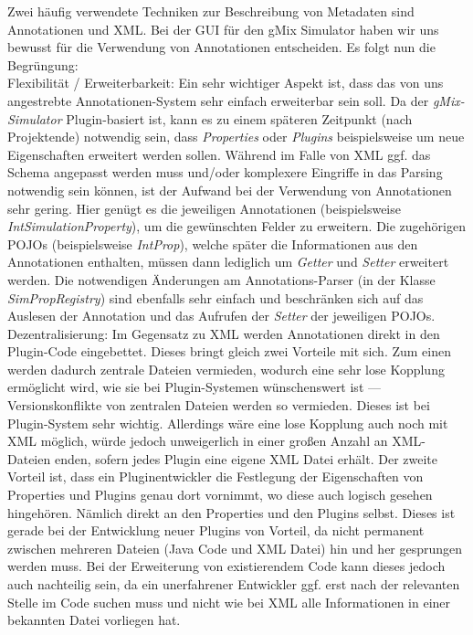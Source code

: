 \documentclass[a4paper, 11pt]{article} %
\begin{document}
Zwei häufig verwendete Techniken zur Beschreibung von Metadaten sind Annotationen und XML. Bei der GUI für den gMix Simulator haben wir uns bewusst für die Verwendung von Annotationen entscheiden. Es folgt nun die Begrüngung:\\

Flexibilität / Erweiterbarkeit: Ein sehr wichtiger Aspekt ist, dass das von uns angestrebte Annotationen-System sehr einfach erweiterbar sein soll. Da der \emph{gMix-Simulator} Plugin-basiert ist, kann es zu einem späteren Zeitpunkt (nach Projektende) notwendig sein, dass \emph{Properties} oder \emph{Plugins} beispielsweise um neue Eigenschaften erweitert werden sollen. Während im Falle von XML ggf. das Schema angepasst werden muss und/oder komplexere Eingriffe in das Parsing notwendig sein können, ist der Aufwand bei der Verwendung von Annotationen sehr gering. Hier genügt es die jeweiligen Annotationen (beispielsweise \emph{IntSimulationProperty}), um die gewünschten Felder zu erweitern. Die zugehörigen POJOs (beispielsweise \emph{IntProp}), welche später die Informationen aus den Annotationen enthalten, müssen dann lediglich um \emph{Getter} und \emph{Setter} erweitert werden. Die notwendigen Änderungen am Annotations-Parser (in der Klasse \emph{SimPropRegistry}) sind ebenfalls sehr einfach und beschränken sich auf das Auslesen der Annotation und das Aufrufen der \emph{Setter} der jeweiligen POJOs.\\

Dezentralisierung: Im Gegensatz zu XML werden Annotationen direkt in den Plugin-Code eingebettet. Dieses bringt gleich zwei Vorteile mit sich. Zum einen werden dadurch zentrale Dateien vermieden, wodurch eine sehr lose Kopplung ermöglicht wird, wie sie bei Plugin-Systemen wünschenswert ist --- Versionskonflikte von zentralen Dateien werden so vermieden. Dieses ist bei Plugin-System sehr wichtig. Allerdings wäre eine lose Kopplung auch noch mit XML möglich, würde jedoch unweigerlich in einer großen Anzahl an XML-Dateien enden, sofern jedes Plugin eine eigene XML Datei erhält. Der zweite Vorteil ist, dass ein Pluginentwickler die Festlegung der Eigenschaften von Properties und Plugins genau dort vornimmt, wo diese auch logisch gesehen hingehören. Nämlich direkt an den Properties und den Plugins selbst. Dieses ist gerade bei der Entwicklung neuer Plugins von Vorteil, da nicht permanent zwischen mehreren Dateien (Java Code und XML Datei) hin und her gesprungen werden muss. Bei der Erweiterung von existierendem Code kann dieses jedoch auch nachteilig sein, da ein unerfahrener Entwickler ggf. erst nach der relevanten Stelle im Code suchen muss und nicht wie bei XML alle Informationen in einer bekannten Datei vorliegen hat.
\end{document}
